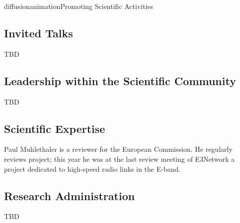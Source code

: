 \documentclass{ra2016}
\begin{document}
\begin{module}{diffusion}{animation}{Promoting Scientific Activities}
\begin{itemize}
\end{itemize}
    
\subsection{Invited Talks}

TBD
\subsection{Leadership within the Scientific Community}
TBD

\subsection{Scientific Expertise}

Paul Muhlethaler is a reviewer for the European Commission. He regularly reviews 
project; this year he was at the last review meeting of E3Network a project dedicated 
to high-speed radio links in the E-band. 

\subsection{Research Administration}
 
 TBD
 
\end{module}
\end{document}
